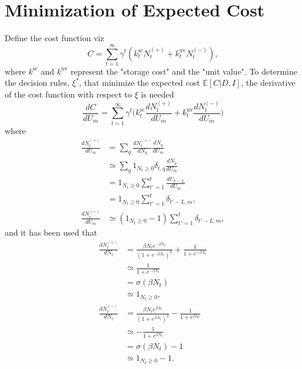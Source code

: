 \section{Minimization of Expected Cost}
\label{app:deriva}
Define the cost function viz
\begin{equation}
	C = \sum_{t=1}^{\infty}\gamma^{t}(k^\text{sc}_{t}N_{t}^{(+)}+k_{t}^\text{uv}N_{t}^{(-)}),
\end{equation}
where $k^\text{sc}$ and $k^\text{uv}$ represent the "storage cost" and the "unit value". To determine the decision rules, $\xi^*$, that minimize the expected cost $\mathbb{E}[C|D,I]$, the derivative of the cost function with respect to $\xi$ is needed
\begin{equation}
		\frac{dC}{dU_m} = \sum_{t=1}^{\infty}\gamma^{t}\bigg(k^\text{sc}_{t}\frac{dN_{t}^{(+)}}{dU_m}+k_{t}^\text{uv}\frac{dN_{t}^{(-)}}{dU_m}\bigg)
	\label{eq:deriv_1ab}
\end{equation}
where
\begin{equation}
	\begin{split}
		\frac{dN_{t}^{(+)}}{dU_m}& =\sum_q 	\frac{dN_{t}^{(+)}}{dN_q}\frac{dN_q}{dU_m}\\
		& \simeq\sum_q 	1_{N_{t}\geq 0}\delta_{t,q}\frac{dN_q}{dU_m}\\
		& = 1_{N_{t}\geq 0}\sum_{t'=1}^t\frac{dU_{t'-L}}{dU_m}\\
		& = 1_{N_{t}\geq 0}\sum_{t'=1}^t\delta_{t'-L,m},\\
		\frac{dN_{t}^{(-)}}{dU_m} &\simeq (1_{N_t\geq 0}-1)\sum_{t'=1}^t\delta_{t'-L,m},
		\label{eq:deriv_2ab}
	\end{split}
\end{equation}
and it has been used that
\begin{equation}
	\begin{split}
		\frac{dN_t^{(+)}}{dN_t} & =\frac{\beta N_te^{-\beta N_t}}{(1+e^{-\beta N_t})^2}+\frac{1}{1+e^{-\beta N_t}}\\
		& \simeq \frac{1}{1+e^{-\beta N_t}}\\
		&= \sigma(\beta N_t)\\
		&\simeq 1_{N_{t}\geq 0},\\
		\frac{dN_t^{(-)}}{dN_t} & = \frac{\beta N_te^{\beta N_t}}{(1+e^{\beta N_t})^2}-\frac{1}{1+e^{\beta N_t}}\\
		& \simeq -\frac{1}{1+e^{\beta N_t}}\\
		&= \sigma(\beta N_t)-1\\
		& \simeq  1_{N_{t}\geq 0}-1.
	\end{split}
\end{equation}
